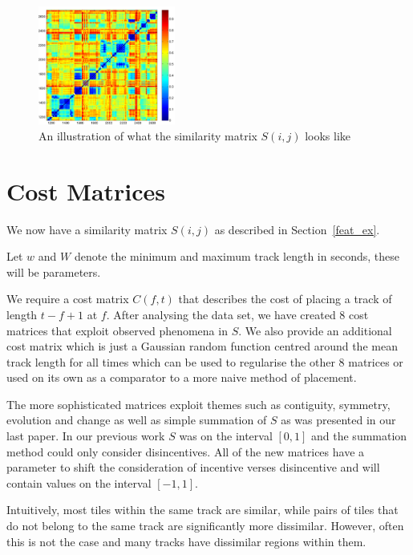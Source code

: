 \documentclass[twocolumn]{article}
\begin{document}
	\begin{figure}[t]
		\centering
		\includegraphics[width=0.4\textwidth]{images/simmat_plain}
		
		\caption{An illustration of what the similarity matrix $S(i,j)$ looks like}
		\label{fig:simmatrix}
	\end{figure} 
	
	\section{Cost Matrices}\label{costmatrix_sec} %
	
	We now have a similarity matrix $S(i,j)$ as described in Section~\ref{feat_ex}. 
	
	Let $w$ and $W$ denote the minimum and maximum track length in seconds, these will be parameters.
	
	We require a cost matrix $C(f,t)$ that describes the cost of placing a track of length $t-f+1$ at $f$. After analysing the data set, we have created $8$ cost matrices that exploit observed phenomena in $S$. We also provide an additional cost matrix which is just a Gaussian random function centred around the mean track length for all times which can be used to regularise the other $8$ matrices or used on its own as a comparator to a more naive method of placement. 
	
	The more sophisticated matrices exploit themes such as contiguity, symmetry, evolution and change as well as simple summation of $S$ as was presented in our last paper. In our previous work \cite{scarfe2013long} $S$ was on the interval $[0,1]$ and the summation method could only consider disincentives. All of the new matrices have a parameter to shift the consideration of incentive verses disincentive and will contain values on the interval $[-1,1]$.
	
	Intuitively, most tiles within the same track are similar, while pairs of tiles that do not belong to the same track are significantly more dissimilar. However, often this is not the case and many tracks have dissimilar regions within them. 
	
\end{document}
